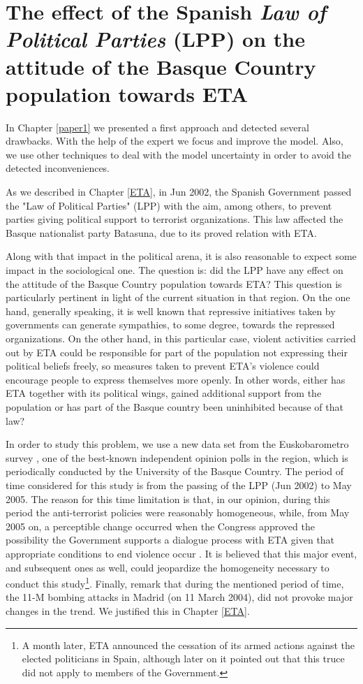 \chapter{The effect of the Spanish \textit{Law of Political Parties} (LPP) on the attitude of the Basque Country population towards ETA}\label{paper2}

In Chapter \ref{paper1} we presented a first approach and detected several drawbacks. With the help of the expert we focus and improve the model. Also, we use other techniques to deal with the model uncertainty in order to avoid the detected inconveniences.

As we described in Chapter \ref{ETA}, in Jun 2002, the Spanish Government passed the "Law of Political Parties" (LPP) with the aim, among others, to prevent parties giving political support to terrorist organizations. This law affected the Basque nationalist party Batasuna, due to its proved relation with ETA. 

Along with that impact in the political arena, it is also reasonable to expect some impact in the sociological one. The question is: did the LPP have any effect on the attitude of the Basque Country population towards ETA? This question is particularly pertinent in light of the current situation in that region. On the one hand, generally speaking, it is well known that repressive initiatives taken by governments can generate sympathies, to some degree, towards the repressed organizations. On the other hand, in this particular case, violent activities carried out by ETA could be responsible for part of the population not expressing their political beliefs freely, so measures taken to prevent ETA's violence could encourage people to express themselves more openly. In other words, either has ETA together with its political wings, gained additional support from the population or has part of the Basque country been uninhibited because of that law? 

In order to study this problem, we use a new data set from the Euskobarometro survey \cite[Table 20]{eusko}, one of the best-known independent opinion polls in the region, which is periodically conducted by the University of the Basque Country. The period of time considered for this study is from the passing of the LPP (Jun 2002) to May 2005. The reason for this time limitation is that, in our opinion, during this period the anti-terrorist policies were reasonably homogeneous, while, from May 2005 on, a perceptible change occurred when the Congress approved the possibility the Government supports a dialogue process with ETA given that appropriate conditions to end violence occur \cite[Resoluci\'on 34, p. 13]{Congreso}. It is believed that this major event, and subsequent ones as well, could jeopardize the homogeneity necessary to conduct this study\footnote{A month later, ETA announced the cessation of its armed actions against the elected politicians in Spain, although later on it pointed out that this truce did not apply to members of the Government.}. Finally, remark that during the mentioned period of time, the 11-M bombing attacks in Madrid (on 11 March 2004), did not provoke major changes in the trend. We justified this in Chapter \ref{ETA}.

